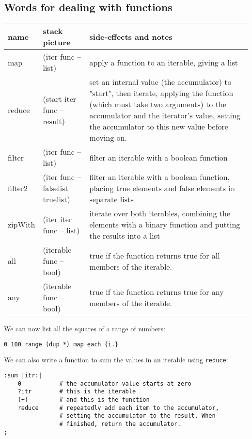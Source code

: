 \subsection{Words for dealing with functions}
\begin{center}
\begin{tabular}{|l|l|p{4in}|}\hline
\textbf{name} & \textbf{stack picture} & \textbf{side-effects and notes}\\ \hline
map &(iter func -- list) & apply a function to an iterable, giving a list\\
reduce & (start iter func -- result) & set an internal value (the accumulator) to "start", then iterate, applying the function (which must take two arguments) to the accumulator and the iterator's value, setting the accumulator to this new value before moving on.\\
filter & (iter func -- list) & filter an iterable with a boolean function\\
filter2 & (iter func -- falselist truelist) & filter an iterable with a boolean function, placing true elements and false elements in separate lists\\
zipWith & (iter iter func -- list) & iterate over both iterables, combining
the elements with a binary function and putting the results into a list\\
all & (iterable func -- bool) & true if the function returns true for all
members of the iterable.\\
any & (iterable func -- bool) & true if the function returns true for any
members of the iterable.\\
\hline
\end{tabular}
\end{center}
\clearpage
We can now list all the squares of a range of numbers:
\begin{lstlisting}
0 100 range (dup *) map each {i.}
\end{lstlisting}

We can also write a function to sum the values in an iterable using
\texttt{reduce}:
\begin{lstlisting}
:sum |itr:|
    0           # the accumulator value starts at zero
    ?itr        # this is the iterable
    (+)         # and this is the function 
    reduce      # repeatedly add each item to the accumulator,
                # setting the accumulator to the result. When
                # finished, return the accumulator.
;
\end{lstlisting}



